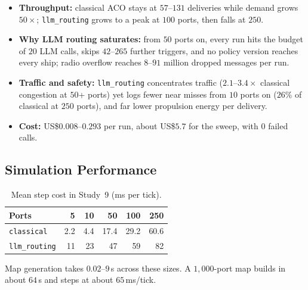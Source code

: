 \documentclass[11pt,a4paper,oneside]{report}
\begin{document}
\begin{itemize}
    \item \textbf{Throughput:} classical ACO stays at $57$--$131$ deliveries while demand grows $50\times$; \texttt{llm\_routing} grows to a peak at $100$ ports, then falls at $250$.
    \item \textbf{Why LLM routing saturates:} from $50$ ports on, every run hits the budget of $20$ LLM calls, skips $42$--$265$ further triggers, and no policy version reaches every ship; radio overflow reaches $8$--$91$ million dropped messages per run.
    \item \textbf{Traffic and safety:} \texttt{llm\_routing} concentrates traffic ($2.1$--$3.4\times$ classical congestion at $50$+ ports) yet logs fewer near misses from $10$ ports on ($26\%$ of classical at $250$ ports), and far lower propulsion energy per delivery.
    \item \textbf{Cost:} US\$$0.008$--$0.293$ per run, about US\$$5.7$ for the sweep, with $0$ failed calls.
\end{itemize}

\subsection{Simulation Performance}
\begin{table}[htbp]
\centering
\caption[Step cost by map size]{Mean step cost in Study~9 (ms per tick).}
\label{tab:perf}
\begin{tabular}{lrrrrr}
\toprule
Ports & 5 & 10 & 50 & 100 & 250 \\
\midrule
\texttt{classical} & 2.2 & 4.4 & 17.4 & 29.2 & 60.6 \\
\texttt{llm\_routing} & 11 & 23 & 47 & 59 & 82 \\
\bottomrule
\end{tabular}
\end{table}
Map generation takes $0.02$--$9$\,s across these sizes. A $1{,}000$-port map builds in about $64$\,s and steps at about $65$\,ms/tick.
\end{document}
